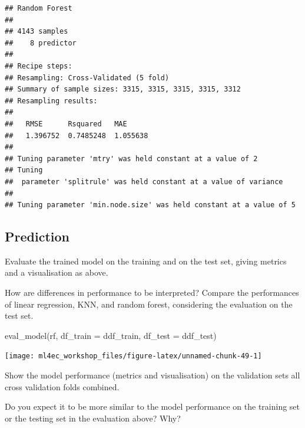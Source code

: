 \documentclass[
]{book}
\newenvironment{Shaded}{\begin{snugshade}}{\end{snugshade}}
\newcommand{\AttributeTok}[1]{\textcolor[rgb]{0.77,0.63,0.00}{#1}}
\newcommand{\FunctionTok}[1]{\textcolor[rgb]{0.00,0.00,0.00}{#1}}
\newcommand{\NormalTok}[1]{#1}
\begin{document}
\begin{verbatim}
## Random Forest 
## 
## 4143 samples
##    8 predictor
## 
## Recipe steps:  
## Resampling: Cross-Validated (5 fold) 
## Summary of sample sizes: 3315, 3315, 3315, 3315, 3312 
## Resampling results:
## 
##   RMSE      Rsquared   MAE     
##   1.396752  0.7485248  1.055638
## 
## Tuning parameter 'mtry' was held constant at a value of 2
## Tuning
##  parameter 'splitrule' was held constant at a value of variance
## 
## Tuning parameter 'min.node.size' was held constant at a value of 5
\end{verbatim}

\hypertarget{prediction-5}{%
\subsection{Prediction}\label{prediction-5}}

Evaluate the trained model on the training and on the test set, giving metrics and a visualisation as above.

How are differences in performance to be interpreted? Compare the performances of linear regression, KNN, and random forest, considering the evaluation on the test set.

\begin{Shaded}
\begin{Highlighting}[]
\FunctionTok{eval\_model}\NormalTok{(rf, }\AttributeTok{df\_train =}\NormalTok{ ddf\_train, }\AttributeTok{df\_test =}\NormalTok{ ddf\_test)}
\end{Highlighting}
\end{Shaded}

\begin{center}\texttt{[image: ml4ec\_workshop\_files/figure-latex/unnamed-chunk-49-1]} \end{center}

Show the model performance (metrics and visualisation) on the validation sets all cross validation folds combined.

Do you expect it to be more similar to the model performance on the training set or the testing set in the evaluation above? Why?
\end{document}
